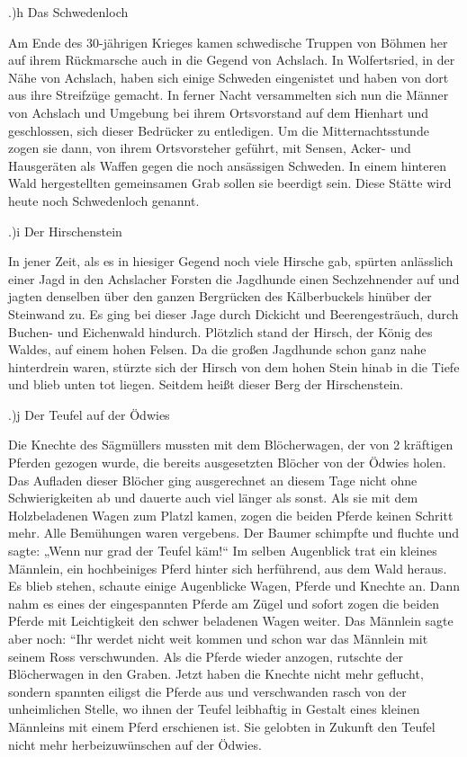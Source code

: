.)h Das Schwedenloch

Am Ende des 30-jährigen Krieges kamen schwedische Truppen von Böhmen her auf
ihrem Rückmarsche auch in die Gegend von Achslach. In Wolfertsried, in der Nähe
von Achslach, haben sich einige Schweden eingenistet und haben von dort aus ihre
Streifzüge gemacht. In ferner Nacht versammelten sich nun die Männer von
Achslach und Umgebung bei ihrem Ortsvorstand auf dem Hienhart und geschlossen,
sich dieser Bedrücker zu entledigen. Um die Mitternachtsstunde zogen sie dann,
von ihrem Ortsvorsteher geführt, mit Sensen, Acker- und Hausgeräten als Waffen
gegen die noch ansässigen Schweden. In einem hinteren Wald hergestellten
gemeinsamen Grab sollen sie beerdigt sein. Diese Stätte wird heute noch
Schwedenloch genannt.

.)i Der Hirschenstein

In jener Zeit, als es in hiesiger Gegend noch viele Hirsche gab, spürten
anlässlich einer Jagd in den Achslacher Forsten die Jagdhunde einen
Sechzehnender auf und jagten denselben über den ganzen Bergrücken des
Kälberbuckels hinüber der Steinwand zu. Es ging bei dieser Jage durch Dickicht
und Beerengesträuch, durch Buchen- und Eichenwald hindurch. Plötzlich stand der
Hirsch, der König des Waldes, auf einem hohen Felsen. Da die großen Jagdhunde
schon ganz nahe hinterdrein waren, stürzte sich der Hirsch von dem hohen Stein
hinab in die Tiefe und blieb unten tot liegen. Seitdem heißt dieser Berg der
Hirschenstein.

.)j Der Teufel auf der Ödwies

Die Knechte des Sägmüllers mussten mit dem Blöcherwagen, der von 2 kräftigen
Pferden gezogen wurde, die bereits ausgesetzten Blöcher von der Ödwies holen.
Das Aufladen dieser Blöcher ging ausgerechnet an diesem Tage nicht ohne
Schwierigkeiten ab und dauerte auch viel länger als sonst. Als sie mit dem
Holzbeladenen Wagen zum Platzl kamen, zogen die beiden Pferde keinen Schritt
mehr. Alle Bemühungen waren vergebens. Der Baumer schimpfte und fluchte und
sagte: „Wenn nur grad der Teufel käm!“ Im selben Augenblick trat ein kleines
Männlein, ein hochbeiniges Pferd hinter sich herführend, aus dem Wald heraus. Es
blieb stehen, schaute einige Augenblicke Wagen, Pferde und Knechte an. Dann nahm
es eines der eingespannten Pferde am Zügel und sofort zogen die beiden Pferde
mit Leichtigkeit den schwer beladenen Wagen weiter. Das Männlein sagte aber
noch: “Ihr werdet nicht weit kommen und schon war das Männlein mit seinem Ross
verschwunden. Als die Pferde wieder anzogen, rutschte der Blöcherwagen in den
Graben. Jetzt haben die Knechte nicht mehr geflucht, sondern spannten eiligst
die Pferde aus und verschwanden rasch von der unheimlichen Stelle, wo ihnen der
Teufel leibhaftig in Gestalt eines kleinen Männleins mit einem Pferd erschienen
ist. Sie gelobten in Zukunft den Teufel nicht mehr herbeizuwünschen auf der
Ödwies.



